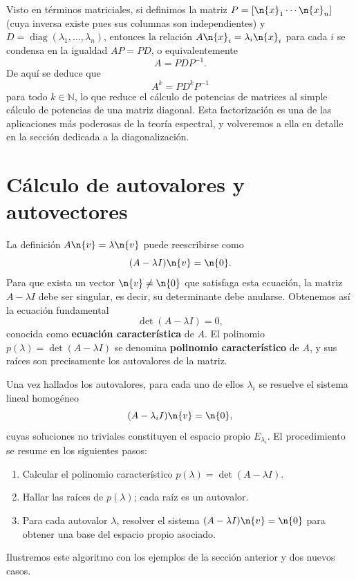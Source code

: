 Visto en términos matriciales, si definimos la matriz $P = [\n{x}_1 \cdots \n{x}_n]$ (cuya inversa existe pues sus columnas son independientes) y $D = \operatorname{diag}(\lambda_1,\dots,\lambda_n)$, entonces la relación $A \n{x}_i = \lambda_i \n{x}_i$ para cada $i$ se condensa en la igualdad $AP = PD$, o equivalentemente
\[
A = P D P^{-1}.
\]
De aquí se deduce que
\[
A^k = P D^k P^{-1}
\]
para todo $k\in\mathbb{N}$, lo que reduce el cálculo de potencias de matrices al simple cálculo de potencias de una matriz diagonal. Esta factorización es una de las aplicaciones más poderosas de la teoría espectral, y volveremos a ella en detalle en la sección dedicada a la diagonalización.





\section{Cálculo de autovalores y autovectores}\label{sec:calculo}

La definición $A\n{v} = \lambda \n{v}$ puede reescribirse como
\[
(A - \lambda I)\n{v} = \n{0}.
\]
Para que exista un vector $\n{v}\neq \n{0}$ que satisfaga esta ecuación, la matriz $A - \lambda I$ debe ser singular, es decir, su determinante debe anularse. Obtenemos así la ecuación fundamental
\[
\det(A - \lambda I) = 0,
\]
conocida como \textbf{ecuación característica} de $A$. El polinomio $p(\lambda) = \det(A - \lambda I)$ se denomina \textbf{polinomio característico} de $A$, y sus raíces son precisamente los autovalores de la matriz.

Una vez hallados los autovalores, para cada uno de ellos $\lambda_i$ se resuelve el sistema lineal homogéneo
\[
(A - \lambda_i I)\n{v} = \n{0},
\]
cuyas soluciones no triviales constituyen el espacio propio $E_{\lambda_i}$. El procedimiento se resume en los siguientes pasos:

\begin{enumerate}
\item Calcular el polinomio característico $p(\lambda) = \det(A - \lambda I)$.
\item Hallar las raíces de $p(\lambda)$; cada raíz es un autovalor.
\item Para cada autovalor $\lambda$, resolver el sistema $(A - \lambda I)\n{v} = \n{0}$ para obtener una base del espacio propio asociado.
\end{enumerate}

Ilustremos este algoritmo con los ejemplos de la sección anterior y dos nuevos casos.

